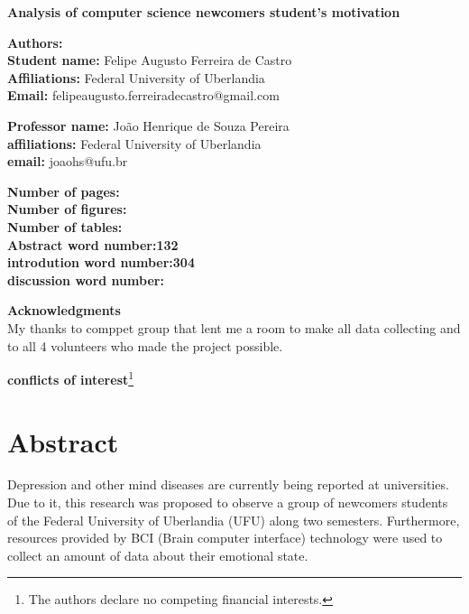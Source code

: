 \documentclass[12pt,openright,a4paper]{article}
\begin{document}
	\linespread{1.5}
 \fontsize{16}{10}\selectfont \centering \textbf{Analysis of computer science newcomers student's motivation} \\
	\fontsize{14}{10}\selectfont {Analysis of student's motivation}\newline

\fontsize{12}{10}
\flushleft
	\textbf{Authors:}\\
	\textbf{Student name:} Felipe Augusto Ferreira de Castro\\
	\textbf{Affiliations:} Federal University of Uberlandia\\
	\textbf{Email:} felipeaugusto.ferreiradecastro@gmail.com \newline
	
\textbf{Professor name:} João Henrique de Souza Pereira\\
\textbf{affiliations:} Federal University of Uberlandia\\
\textbf{email:} joaohs@ufu.br\newline

\textbf{Number of pages:}\\
\textbf{Number of figures:}\\
\textbf{Number of tables:}\\
\textbf{Abstract word number:132}\\
\textbf{introdution word number:304}\\
\textbf{discussion word number:}\newline
	
\textbf{Acknowledgments}\\	
My thanks to comppet group that lent me a room to make all data collecting and to all 4 volunteers who made the project possible.\newline

\textbf{conflicts of interest}\footnote{The authors declare no competing financial interests.}

\newpage
\tableofcontents
\newpage
\section{Abstract}
Depression and other mind diseases are currently being reported at universities. Due to it, this research was proposed to observe a group of newcomers students of the Federal University of Uberlandia (UFU) along two semesters. Furthermore, resources provided by BCI (Brain computer interface)  technology were used to collect an amount of data about their emotional state.
\end{document}
